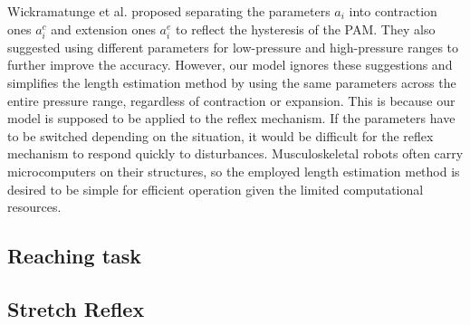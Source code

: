 Wickramatunge et al. proposed separating the parameters $a_i$ into contraction ones $a^c_i$ and extension ones $a^e_i$ to reflect the hysteresis of the PAM\cite{spring}. They also suggested using different parameters for low-pressure and high-pressure ranges to further improve the accuracy. However, our model ignores these suggestions and simplifies the length estimation method by using the same parameters across the entire pressure range, regardless of contraction or expansion. This is because our model is supposed to be applied to the reflex mechanism. If the parameters have to be switched depending on the situation, it would be difficult for the reflex mechanism to respond quickly to disturbances.
Musculoskeletal robots often carry microcomputers on their structures, so the employed length estimation method is desired to be simple for efficient operation given the limited computational resources.

\subsection{Reaching task}
\subsection{Stretch Reflex}

 


